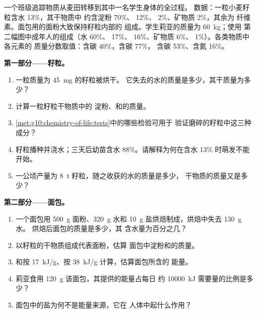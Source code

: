 \begin{problem}
\label{pb:g10:chemistry-of-life:1}
一个班级追踪物质从麦田转移到其中一名学生身体的全过程。
数据：一粒小麦籽粒含水 13\%，其干物质中
约含淀粉 70\%、 12\%、 2\%、矿物质 2\%，其余为
纤维素。面包用的面粉大致保持籽粒内部的
组成。学生莉亚的质量为 \qty{60}{kg}；使用
第二幅图中成年人的组成（水 60\%、 17\%、
 16\%、矿物质 6\%、 1\%）。各类物质中各元素的
质量分数取值：含碳 40\%，含碳 77\%，
含碳 53\%、含氮 16\%。

\medskip
\noindent\textbf{第一部分——籽粒。}
\begin{enumerate}
  \item 一粒质量为 \qty{45}{mg} 的籽粒被烘干。
        它失去的水的质量是多少，其干质量为多少？
  \item 计算一粒籽粒干物质中的
        淀粉、和的质量。
  \item \cref{met:g10:chemistry-of-life:tests}中的哪些检验可用于
        验证磨碎的籽粒中这三种成分？
  \item 籽粒播种并浇水；三天后幼苗含水
        88\%。请解释为何在含水 13\% 时萌发不能开始。
  \item 一公顷产量为 \qty{8}{t} 籽粒，随之收获的水的质量是多少，
        干物质的质量又是多少？
\end{enumerate}

\medskip
\noindent\textbf{第二部分——面包。}
\begin{enumerate}[resume]
  \item 一个面包用 \qty{500}{g} 面粉、\qty{320}{g} 水和
        \qty{10}{g} 盐烘焙制成，烘焙中失去 \qty{130}{g} 水。
        烘焙后面包的质量是多少，其
        含水量为百分之几？
  \item 以籽粒的干物质组成代表面粉，估算
        面包中淀粉和的质量。
  \item {}和按 \qty{17}{kJ/g}、按
        \qty{38}{kJ/g} 计算，估算面包所含的
        能量。
  \item 莉亚食用 \qty{120}{g} 该面包，其提供的能量占每日
        约 \qty{10000}{kJ} 需要量的比例是多少？
  \item 面包中的盐为何不是能量来源，它在
        人体中起什么作用？
\end{enumerate}


\end{problem}
